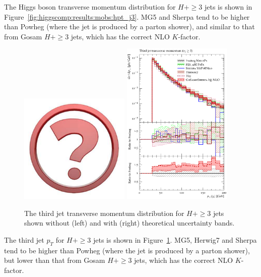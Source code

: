 The Higgs boson transverse momentum distribution for $H+\ge3$ jets is
shown in Figure~\ref{fig:higgscomp:results:mobs:hpt_j3}. MG5 and
Sherpa tend to be higher than Powheg (where the jet is produced by a
parton shower), and similar to that from Gosam $H+\ge3$ jets, which
has the correct NLO $K$-factor.

\begin{figure}[t!]
  \centering
  \includegraphics[width=0.47\textwidth]{Micon.pdf}
  \hfill
  \includegraphics[width=0.47\textwidth]{figures/hjetscomp_jet3_pT_incl.pdf}
  \caption{
    The third jet transverse momentum distribution for $H+\ge3$ jets
    shown without (left) and with (right) theoretical uncertainty bands.
    \label{fig:higgscomp:results:mobs:j3pt}
  }
\end{figure}

The third jet $p_T$ for $H+\ge3$ jets is shown in
Figure~\ref{fig:higgscomp:results:mobs:j3pt}. MG5, Herwig7 and Sherpa
tend to be higher than Powheg (where the jet is produced by a parton
shower), but lower than that from Gosam $H+\ge3$ jets, which has the
correct NLO $K$-factor.

